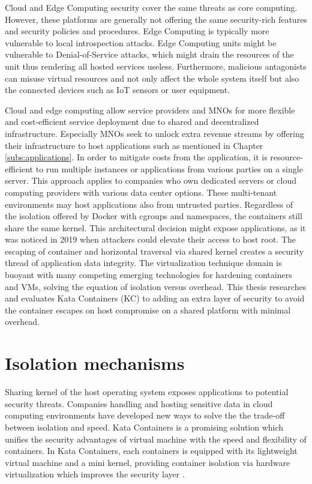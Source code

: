 Cloud and Edge Computing security cover the same threats as core computing. However, these platforms are generally not offering the same security-rich features and security policies and procedures. Edge Computing is typically more vulnerable to local introspection attacks. Edge Computing units might be vulnerable to Denial-of-Service attacks, which might drain the resources of the unit thus rendering all hosted services useless. Furthermore, malicious antagonists can misuse virtual resources and not only affect the whole system itself but also the connected devices such as IoT sensors or user equipment. \cite{EdgeComputing5G} \cite{Abbas2018}

Cloud and edge computing allow service providers and MNOs for more flexible and cost-efficient service deployment due to shared and decentralized infrastructure. Especially MNOs seek to unlock extra revenue streams by offering their infrastructure to host applications such as mentioned in Chapter \ref{subs:applications}. In order to mitigate costs from the application, it is resource-efficient to run multiple instances or applications from various parties on a single server. This approach applies to companies who own dedicated servers or cloud computing providers with various data center options. These multi-tenant environments may host applications also from untrusted parties. Regardless of the isolation offered by Docker with cgroups and namespaces, the containers still share the same kernel. This architectural decision might expose applications, as it was noticed in 2019 \cite{CVE-2020-14386}\cite{CVE-2019-5736} when attackers could elevate their access to host root. The escaping of container and horizontal traversal via shared kernel creates a security thread of application data integrity. The virtualization technique domain is buoyant with many competing emerging technologies for hardening containers and VMs, solving the equation of isolation versus overhead. This thesis researches and evaluates Kata Containers (KC) to adding an extra layer of security to avoid the container escapes on host compromise on a shared platform with minimal overhead. \cite{EdgeComputing5G}

\section{Isolation mechanisms}

Sharing kernel of the host operating system exposes applications to potential security threats. Companies handling and hosting sensitive data in cloud computing environments have developed new ways to solve the the trade-off between isolation and speed. Kata Containers is a promising solution which unifies the security advantages of virtual machine with the speed and flexibility of containers. In Kata Containers, each containers is equipped with its lightweight virtual machine and a mini kernel, providing container isolation via hardware virtualization which improves the security layer \cite{Kumar2020}.

